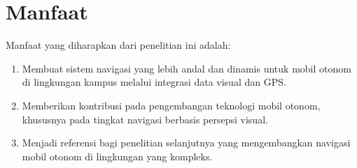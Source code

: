 \section{Manfaat}
\label{sec:manfaat}

Manfaat yang diharapkan dari penelitian ini adalah:
\begin{enumerate}
    \item Membuat sistem navigasi yang lebih andal dan dinamis untuk mobil otonom di lingkungan kampus melalui integrasi data visual dan GPS.
    \item Memberikan kontribusi pada pengembangan teknologi mobil otonom, khususnya pada tingkat navigasi berbasis persepsi visual.
    \item Menjadi referensi bagi penelitian selanjutnya yang mengembangkan navigasi mobil otonom di lingkungan yang kompleks.
\end{enumerate}
